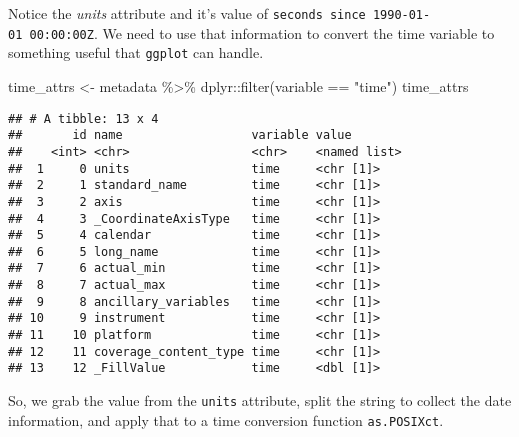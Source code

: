 \documentclass[
]{book}
\newenvironment{Shaded}{\begin{snugshade}}{\end{snugshade}}
\newcommand{\AttributeTok}[1]{\textcolor[rgb]{0.77,0.63,0.00}{#1}}
\newcommand{\CommentTok}[1]{\textcolor[rgb]{0.56,0.35,0.01}{\textit{#1}}}
\newcommand{\DecValTok}[1]{\textcolor[rgb]{0.00,0.00,0.81}{#1}}
\newcommand{\FunctionTok}[1]{\textcolor[rgb]{0.00,0.00,0.00}{#1}}
\newcommand{\NormalTok}[1]{#1}
\newcommand{\OtherTok}[1]{\textcolor[rgb]{0.56,0.35,0.01}{#1}}
\newcommand{\SpecialCharTok}[1]{\textcolor[rgb]{0.00,0.00,0.00}{#1}}
\newcommand{\StringTok}[1]{\textcolor[rgb]{0.31,0.60,0.02}{#1}}
\begin{document}
Notice the \emph{units} attribute and it's value of \texttt{seconds\ since\ 1990-01-01\ 00:00:00Z}. We need to use that information to convert the time variable to something useful that \texttt{ggplot} can handle.

\begin{Shaded}
\begin{Highlighting}[]
\NormalTok{time\_attrs }\OtherTok{\textless{}{-}}\NormalTok{ metadata }\SpecialCharTok{\%\textgreater{}\%}\NormalTok{ dplyr}\SpecialCharTok{::}\FunctionTok{filter}\NormalTok{(variable }\SpecialCharTok{==} \StringTok{"time"}\NormalTok{)}
\NormalTok{time\_attrs}
\end{Highlighting}
\end{Shaded}

\begin{verbatim}
## # A tibble: 13 x 4
##       id name                  variable value       
##    <int> <chr>                 <chr>    <named list>
##  1     0 units                 time     <chr [1]>   
##  2     1 standard_name         time     <chr [1]>   
##  3     2 axis                  time     <chr [1]>   
##  4     3 _CoordinateAxisType   time     <chr [1]>   
##  5     4 calendar              time     <chr [1]>   
##  6     5 long_name             time     <chr [1]>   
##  7     6 actual_min            time     <chr [1]>   
##  8     7 actual_max            time     <chr [1]>   
##  9     8 ancillary_variables   time     <chr [1]>   
## 10     9 instrument            time     <chr [1]>   
## 11    10 platform              time     <chr [1]>   
## 12    11 coverage_content_type time     <chr [1]>   
## 13    12 _FillValue            time     <dbl [1]>
\end{verbatim}

So, we grab the value from the \texttt{units} attribute, split the string to collect the date information, and apply that to a time conversion function \texttt{as.POSIXct}.

\begin{Shaded}
\end{Shaded}
\end{document}
